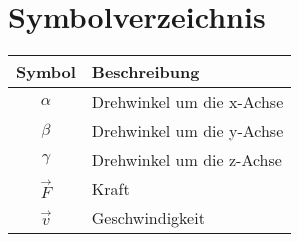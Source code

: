 \documentclass[12pt,a4paper]{scrbook}
\begin{document}
\tableofcontents
\chapter*{Symbolverzeichnis}
\begin{table}[h]
	\begin{tabularx}{\textwidth}{cX}
		\toprule
		\textbf{Symbol} & \textbf{Beschreibung} \\
		\midrule
		$\alpha$		&	Drehwinkel um die x-Achse \\
		$\beta$		&	Drehwinkel um die y-Achse \\
		$\gamma$		&	Drehwinkel um die z-Achse \\
		$\vec{F}$	&	Kraft \\
		$\vec{v}$	&	Geschwindigkeit	\\
		\bottomrule
	\end{tabularx}
\end{table}
\end{document}
